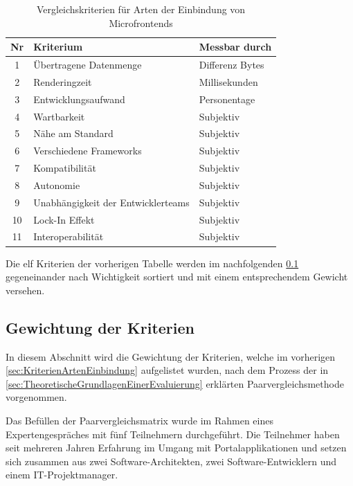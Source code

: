 \begin{table}[hbt]
	\centering
	\begin{minipage}[t]{1\textwidth}	
		\caption{Vergleichskriterien für Arten der Einbindung von Microfrontends}
		\begin{tabularx}{\columnwidth}{|cXX|}
			\toprule
			\textbf{Nr} & \textbf{Kriterium}	& \textbf{Messbar durch} \\
			\midrule
			1 & Übertragene Datenmenge & Differenz Bytes \\
			2 & Renderingzeit & Millisekunden \\
			3 & Entwicklungsaufwand & Personentage \\
			4 & Wartbarkeit & Subjektiv \\
			5 & Nähe am Standard & Subjektiv \\
			6 & Verschiedene Frameworks & Subjektiv \\
			7 & Kompatibilität & Subjektiv \\
			8 & Autonomie & Subjektiv \\
			9 & Unabhängigkeit der Entwicklerteams & Subjektiv \\
			10 & Lock-In Effekt & Subjektiv \\
			11 & Interoperabilität & Subjektiv \\
			\bottomrule
		\end{tabularx}
		\label{tab:UebersichtKriterien}
	\end{minipage}
\end{table}

Die elf Kriterien der vorherigen Tabelle werden im nachfolgenden \cref{sec:GewichtenKriterien} gegeneinander nach Wichtigkeit sortiert und mit einem entsprechendem Gewicht versehen.

\subsection{Gewichtung der Kriterien}\label{sec:GewichtenKriterien}

In diesem Abschnitt wird die Gewichtung der Kriterien, welche im vorherigen \cref{sec:KriterienArtenEinbindung} aufgelistet wurden, nach dem Prozess der in \cref{sec:TheoretischeGrundlagenEinerEvaluierung} erklärten Paarvergleichsmethode vorgenommen.

Das Befüllen der Paarvergleichsmatrix wurde im Rahmen eines Expertengespräches mit fünf Teilnehmern durchgeführt. Die Teilnehmer haben seit mehreren Jahren Erfahrung im Umgang mit Portalapplikationen und setzen sich zusammen aus zwei Software-Architekten, zwei Software-Entwicklern und einem IT-Projektmanager.

